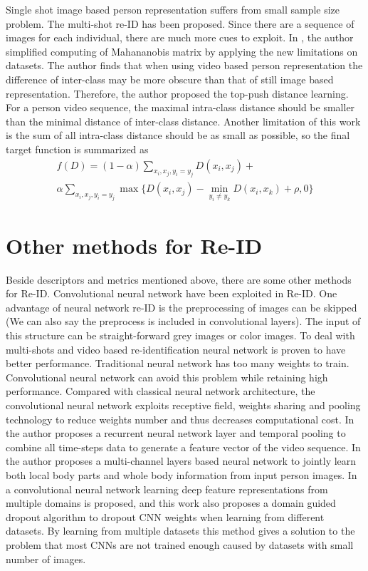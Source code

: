 Single shot image based person representation suffers from small sample size problem. The multi-shot re-ID has been proposed. Since there are a sequence of images for each individual, there are much more cues to exploit.
In \cite{TDL}, the author simplified computing of Mahananobis matrix by applying the new limitations on datasets. The author finds that when using video based person representation the difference of inter-class may be more obscure than that of still image based representation. Therefore, the author proposed the top-push distance learning. For a person video sequence, the maximal intra-class distance should be smaller than the minimal distance of inter-class distance. Another limitation of this work is the sum of all intra-class distance should be as small as possible, so the final target function is summarized as 
\begin{equation}
\begin{aligned}
f(D) = (1-\alpha)\sum_{x_i,x_j,y_i=y_j} D(x_i,x_j) + \\
\alpha \sum_{x_i,x_j,y_i=y_j}\max\{{D(x_i,x_j)-\min_{y_i\ne y_k}{D(x_i,x_k)}+\rho,0}\}
\end{aligned}
\end{equation}

\section{Other methods for Re-ID}
Beside descriptors and metrics mentioned above, there are some other methods for Re-ID. Convolutional neural network have been exploited in Re-ID. One advantage of neural network re-ID is the preprocessing of images can be skipped (We can also say the preprocess is included in convolutional layers). The input of this structure can be straight-forward grey images or color images. To deal with multi-shots and video based re-identification neural network is proven to have better performance. Traditional neural network has too many weights to train. Convolutional neural network can avoid this problem while retaining high performance. Compared with classical neural network architecture, the convolutional neural network exploits receptive field, weights sharing and pooling technology to reduce weights number and thus decreases computational cost. In \cite{RecurrentCNN} the author proposes a recurrent neural network layer and temporal pooling to combine all time-steps data to generate a feature vector of the video sequence. In \cite{MultiCNN} the author proposes a multi-channel layers based neural network to jointly learn both local body parts and whole body information from input person images.  In \cite{DeepfeatureCNN} a convolutional neural network learning deep feature representations from multiple domains is proposed, and this work also proposes a domain guided dropout algorithm to dropout CNN weights when learning from different datasets. By learning from multiple datasets this method gives a solution to the problem that most CNNs are not trained enough caused by datasets with small number of images.

